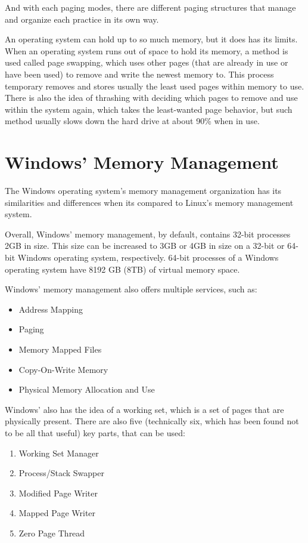 \documentclass[letterpaper,10pt,onecolumn]{IEEEtran}
\begin{document}
\par \noindent
And with each paging modes, there are different paging structures that manage and organize each practice in its own way.
\newpage
\par
An operating system can hold up to so much memory, but it does has its limits. When an operating system runs out of space to hold its memory, a method is used called page swapping, which uses other pages (that are already in use or have been used) to remove and write the newest memory to. This process temporary removes and stores usually the least used pages within memory to use. There is also the idea of thrashing with deciding which pages to remove and use within the system again, which takes the least-wanted page behavior, but such method usually slows down the hard drive at about 90\% when in use.
\iffalse
\par
There is something else more that goes after this chunk of information that is explained in my notes from class, but unsure I am unsure how to or if I should add it within this report. Possibly come back to it later and see if it is then more relevant to write in.
\fi


\section*{Windows' Memory Management}
\par
The Windows operating system's memory management organization has its similarities and differences when its compared to Linux's memory management system.
\par
Overall, Windows' memory management, by default, contains 32-bit processes 2GB in size. This size can be increased to 3GB or 4GB in size on a 32-bit or 64-bit Windows operating system, respectively.  64-bit processes of a Windows operating system have 8192 GB (8TB) of virtual memory space.

\par
Windows' memory management also offers multiple services, such as:
\begin{itemize}
	\item Address Mapping
	\item Paging
	\item Memory Mapped Files
	\item Copy-On-Write Memory
	\item Physical Memory Allocation and Use
\end{itemize}

\par
Windows' also has the idea of a working set, which is a set of pages that are physically present. There are also five (technically six, which has been found not to be all that useful) key parts, that can be used:
\begin{enumerate}
	\item Working Set Manager
	\item Process/Stack Swapper
	\item Modified Page Writer
	\item Mapped Page Writer
	\item Zero Page Thread
\end{enumerate}
\end{document}
